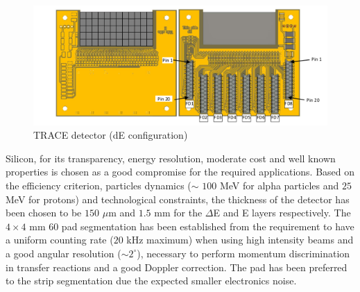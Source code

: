 \begin{figure}[h]
  \centering
  \includegraphics[scale=.65]{img/trace_de.png}
  \caption{TRACE detector (dE configuration)}
  \label{chain}
\end{figure}

\bigbreak

Silicon, for its transparency, energy resolution, moderate cost and
well known properties is chosen as a good compromise for the required
applications. Based on the efficiency criterion, particles dynamics ($\sim$
$100$ MeV for alpha particles and $25$ MeV for protons) and technological
constraints, the thickness of the detector has been chosen to be $150$ $\mu$m
and $1.5$ mm for the $\Delta$E and E layers respectively. The $4 \times 4$ mm
60 pad segmentation has been established from the requirement to have a uniform
counting rate ($20$ kHz maximum) when using high intensity beams and a good
angular resolution ($\sim 2^\circ$), necessary to perform momentum
discrimination in transfer reactions and a good Doppler correction. The pad
has been preferred to the strip segmentation due the expected smaller
electronics noise.
